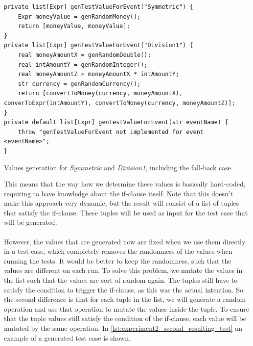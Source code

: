 \FloatBarrier
\begin{sourcecode}[!ht]
\begin{lstlisting}[language=Rascal]
private list[Expr] genTestValueForEvent("Symmetric") {
    Expr moneyValue = genRandomMoney();
    return [moneyValue, moneyValue];
}
private list[Expr] genTestValueForEvent("Division1") {
    real moneyAmountX = genRandomDouble();
    real intAmountY = genRandomInteger();
    real moneyAmountZ = moneyAmountX * intAmountY;
    str currency = genRandomCurrency();
    return [convertToMoney(currency, moneyAmountX), converToExpr(intAmountY), convertToMoney(currency, moneyAmountZ)];
}
private default list[Expr] genTestValueForEvent(str eventName) {
    throw "genTestValueForEvent not implemented for event <eventName>";
}
\end{lstlisting}
\caption{Values generation for \textit{Symmetric} and \textit{Division1}, including the fall-back case.}
\label{lst:ch4_second_generating_values}
\end{sourcecode}
\FloatBarrier
This means that the way how we determine these values is basically hard-coded, requiring to have knowledge about the if-clause itself. Note that this doesn't make this approach very dynamic, but the result will consist of a list of tuples that satisfy the if-clause. These tuples will be used as input for the test case that will be generated.\\
\\
However, the values that are generated now are fixed when we use them directly in a test case, which completely removes the randomness of the values when running the tests. It would be better to keep the randomness, such that the values are different on each run. To solve this problem, we mutate the values in the list such that the values are sort of random again. The tuples still have to satisfy the condition to trigger the if-clause, as this was the actual intention. So the second difference is that for each tuple in the list, we will generate a random operation and use that operation to mutate the values inside the tuple. To ensure that the tuple values still satisfy the condition of the if-clause, each value will be mutated by the same operation. In \autoref{lst:experiment2_second_resulting_test} an example of a generated test case is shown.
\FloatBarrier
